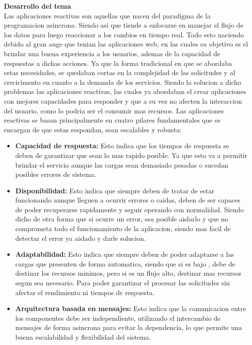 \documentclass[12pt]{article}
\begin{document}
\vspace{1em}
\noindent\textbf{Desarrollo del tema} \\
Las aplicaciones reactivas son aquellas que nacen del paradigma de la programacion asincrona. Siendo asi que tiende a enfocarse en manejar el flujo de los datos para luego reaccionar a los cambios en tiempo real. 
Todo esto naciendo debido al gran auge que tenian las aplicaciones web, en las cuales su objetivo es el brindar una buena experiencia a los usuarios, ademas de la capacidad de respuestas a dichas acciones. Ya que la forma tradicional en que se abordaba estas necesidades, se quedaban cortas en la complejidad de las solicitudes y al crecicimento en cuanto a la demanda de los servicios. Siendo la solucion a dicho problemas las aplicaciones reactivas, las cuales ya abordaban el crear aplicaciones con mejores capacidades para responder y que a su vez no afecten la interaccion del usuario, como lo podria ser el consumir mas recursos. 
Las aplicaciones reactivas se basan principalmente en cuatro pilares fundamentales que se encargan de que estas respondan, sean escalables y robusta: 

\begin{itemize}
    \item\textbf{Capacidad de respuesta:} Esto indica que los tiempos de respuesta se deben de garantizar que sean lo mas rapido posible. Ya que esto va a permitir  brindar el servicio aunque las cargas sean demasiado pesadas o sucedan posibles errores de sistema. 
    \item\textbf{Disponibilidad:} Esto indica que siempre deben de tratar de estar funcionando aunque lleguen a ocurrir errores o caidas, deben de ser capaces de poder recuperarse rapidamente y seguir operando con normalidad. Siendo dicho de otra forma que si ocurre un error, sea posible aislarlo y que no comprometa todo el funcionamiento de la aplicacion, siendo mas facil de detectar el error ya aislado y darle solucion. 
    \item \textbf{Adaptabilidad:} Esto indica que siempre deben de poder adaptarse a las cargas que presenten de forma automatica, siendo que si es bajo , debe de destinar los recursos minimos, pero si es un flujo alto, destinar mas recursos segun sea necesario. Para poder garantizar el procesar las solicitudes sin afectar el rendimiento ni tiempos de respuesta.
    \item\textbf{Arquitectura basada en mensajes:} Esto indica que la comunicacion entre los componentes debe ser independiente, utilizando el intercambio de mensajes de forma asincrona para evitar la dependencia, lo que permite una buena escalabilidad y flexibilidad del sistema.

\end{itemize}
\end{document}
